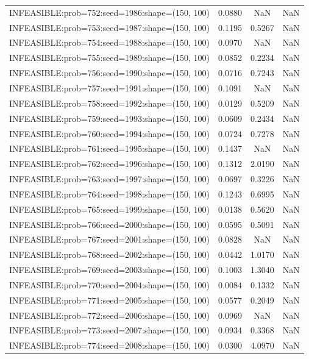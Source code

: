 \begin{longtable}{lccc}
INFEASIBLE:prob=752:seed=1986:shape=(150, 100) & 0.0880 &     NaN &    NaN \\
INFEASIBLE:prob=753:seed=1987:shape=(150, 100) & 0.1195 &  0.5267 &    NaN \\
INFEASIBLE:prob=754:seed=1988:shape=(150, 100) & 0.0970 &     NaN &    NaN \\
INFEASIBLE:prob=755:seed=1989:shape=(150, 100) & 0.0852 &  0.2234 &    NaN \\
INFEASIBLE:prob=756:seed=1990:shape=(150, 100) & 0.0716 &  0.7243 &    NaN \\
INFEASIBLE:prob=757:seed=1991:shape=(150, 100) & 0.1091 &     NaN &    NaN \\
INFEASIBLE:prob=758:seed=1992:shape=(150, 100) & 0.0129 &  0.5209 &    NaN \\
INFEASIBLE:prob=759:seed=1993:shape=(150, 100) & 0.0609 &  0.2434 &    NaN \\
INFEASIBLE:prob=760:seed=1994:shape=(150, 100) & 0.0724 &  0.7278 &    NaN \\
INFEASIBLE:prob=761:seed=1995:shape=(150, 100) & 0.1437 &     NaN &    NaN \\
INFEASIBLE:prob=762:seed=1996:shape=(150, 100) & 0.1312 &  2.0190 &    NaN \\
INFEASIBLE:prob=763:seed=1997:shape=(150, 100) & 0.0697 &  0.3226 &    NaN \\
INFEASIBLE:prob=764:seed=1998:shape=(150, 100) & 0.1243 &  0.6995 &    NaN \\
INFEASIBLE:prob=765:seed=1999:shape=(150, 100) & 0.0138 &  0.5620 &    NaN \\
INFEASIBLE:prob=766:seed=2000:shape=(150, 100) & 0.0595 &  0.5091 &    NaN \\
INFEASIBLE:prob=767:seed=2001:shape=(150, 100) & 0.0828 &     NaN &    NaN \\
INFEASIBLE:prob=768:seed=2002:shape=(150, 100) & 0.0442 &  1.0170 &    NaN \\
INFEASIBLE:prob=769:seed=2003:shape=(150, 100) & 0.1003 &  1.3040 &    NaN \\
INFEASIBLE:prob=770:seed=2004:shape=(150, 100) & 0.0084 &  0.1332 &    NaN \\
INFEASIBLE:prob=771:seed=2005:shape=(150, 100) & 0.0577 &  0.2049 &    NaN \\
INFEASIBLE:prob=772:seed=2006:shape=(150, 100) & 0.0969 &     NaN &    NaN \\
INFEASIBLE:prob=773:seed=2007:shape=(150, 100) & 0.0934 &  0.3368 &    NaN \\
INFEASIBLE:prob=774:seed=2008:shape=(150, 100) & 0.0300 &  4.0970 &    NaN \\

\end{longtable}
